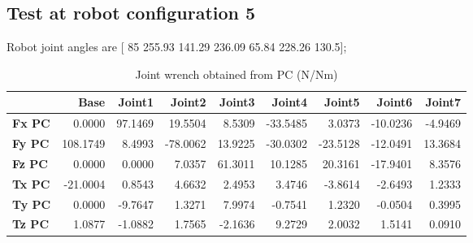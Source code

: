 
\subsection{Test at robot configuration 5}
Robot joint angles are  [ 85        255.93        141.29        236.09         65.84        228.26         130.5];

\begin{table}[h!]
	\centering
	\caption{Joint wrench obtained from PC (N/Nm)}
	\label{wrech_PC_Pose5}
	\begin{tabular}{|l|r|r|r|r|r|r|r|r|}
		\hline
		\textbf{}  & \textbf{Base} & \textbf{Joint1}  & \textbf{Joint2}  & \textbf{Joint3}  & \textbf{Joint4}  & \textbf{Joint5}  & \textbf{Joint6}  & \textbf{Joint7} \\ \hline
		\textbf{Fx PC}  & 0.0000        & 97.1469        & 19.5504        & 8.5309        & -33.5485        & 3.0373        & -10.0236        & -4.9469 \\ \hline
		\textbf{Fy PC}  & 108.1749        & 8.4993        & -78.0062        & 13.9225        & -30.0302        & -23.5128        & -12.0491        & 13.3684 \\ \hline
		\textbf{Fz PC}  & 0.0000        & 0.0000        & 7.0357        & 61.3011        & 10.1285        & 20.3161        & -17.9401        & 8.3576 \\ \hline
		\textbf{Tx PC}  & -21.0004        & 0.8543        & 4.6632        & 2.4953        & 3.4746        & -3.8614        & -2.6493        & 1.2333 \\ \hline
		\textbf{Ty PC}  & 0.0000        & -9.7647        & 1.3271        & 7.9974        & -0.7541        & 1.2320        & -0.0504        & 0.3995 \\ \hline
		\textbf{Tz PC}  & 1.0877        & -1.0882        & 1.7565        & -2.1636        & 9.2729        & 2.0032        & 1.5141        & 0.0910 \\ \hline
	\end{tabular}
\end{table}

